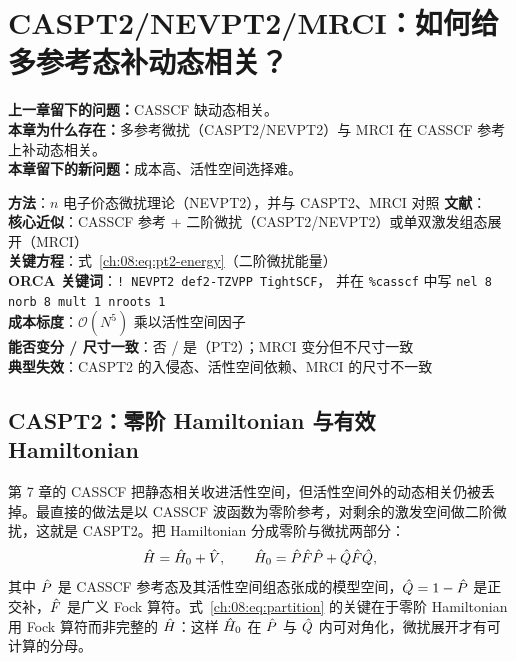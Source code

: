 
\section{CASPT2/NEVPT2/MRCI：如何给多参考态补动态相关？}
\label{ch:08:sec:title}

\begin{problemchain}
\textbf{上一章留下的问题：}CASSCF 缺动态相关。\\
\textbf{本章为什么存在：}多参考微扰（CASPT2/NEVPT2）与 MRCI 在 CASSCF 参考上补动态相关。\\
\textbf{本章留下的新问题：}成本高、活性空间选择难。
\end{problemchain}

\begin{methodcard}
\textbf{方法}：$n$ 电子价态微扰理论（NEVPT2），并与 CASPT2、MRCI 对照\quad
\textbf{文献}：\citep{andersson1990,angeli2001,werner1988,knowles1988,lischka2018mr}\\
\textbf{核心近似}：CASSCF 参考 + 二阶微扰（CASPT2/NEVPT2）或单双激发组态展开（MRCI）\\
\textbf{关键方程}：式~\eqref{ch:08:eq:pt2-energy}（二阶微扰能量）\\
\textbf{ORCA 关键词}：\texttt{! NEVPT2 def2-TZVPP TightSCF}，
并在 \texttt{\%casscf} 中写 \texttt{nel 8 norb 8 mult 1 nroots 1}\\
\textbf{成本标度}：$\mathcal{O}(N^5)$ 乘以活性空间因子\\
\textbf{能否变分 / 尺寸一致}：否 / 是（PT2）；MRCI 变分但不尺寸一致\\
\textbf{典型失效}：CASPT2 的入侵态、活性空间依赖、MRCI 的尺寸不一致
\end{methodcard}

\subsection{CASPT2：零阶 Hamiltonian 与有效 Hamiltonian}
\label{ch:08:sec:caspt2}

第 7 章的 CASSCF 把静态相关收进活性空间，但活性空间外的动态相关仍被丢掉。最直接的做法是以 CASSCF 波函数为零阶参考，对剩余的激发空间做二阶微扰，这就是 CASPT2\citep{andersson1990}。把 Hamiltonian 分成零阶与微扰两部分：
\begin{equation}
\hat{H}=\hat{H}_0+\hat{V},
\qquad
\hat{H}_0=\hat{P}\hat{F}\hat{P}+\hat{Q}\hat{F}\hat{Q},
\label{ch:08:eq:partition}
\end{equation}
其中 $\hat{P}$ 是 CASSCF 参考态及其活性空间组态张成的模型空间，$\hat{Q}=1-\hat{P}$ 是正交补，$\hat{F}$ 是广义 Fock 算符。式~\eqref{ch:08:eq:partition} 的关键在于零阶 Hamiltonian 用 Fock 算符而非完整的 $\hat{H}$：这样 $\hat{H}_0$ 在 $\hat{P}$ 与 $\hat{Q}$ 内可对角化，微扰展开才有可计算的分母。

